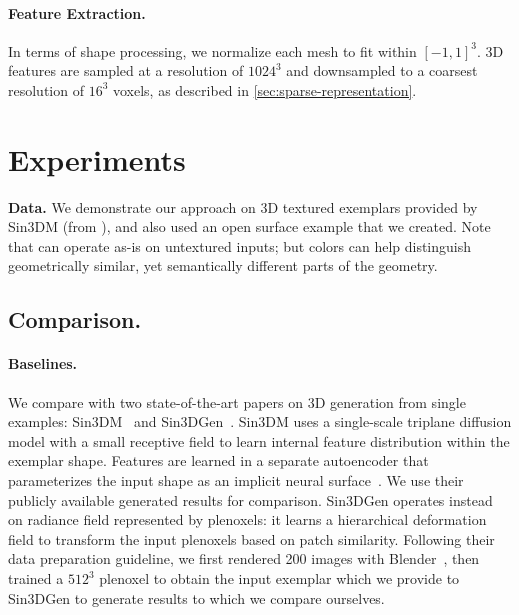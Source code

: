 \paragraph{Feature Extraction.}
In terms of shape processing, we normalize each mesh to fit within $[-1, 1]^3$.
3D features are sampled at a resolution of $1024^3$ and downsampled to a coarsest resolution of $16^3$ voxels, as described in \cref{sec:sparse-representation}.

\section{Experiments}\label{sec:experiments}

\noindent\textbf{Data.} We demonstrate our approach on 3D textured exemplars provided by Sin3DM (from \cite{impjive2021pillar,
kurd2021akropolis,
ashoori2020smalltown,
ustal2020canyon,
carnota2015industrial,
djmaesen2021cliff,
allaboutblender2020wood}), and also used an open surface example that we created.
Note that \ourmethod can operate as-is on untextured inputs; but colors can help distinguish geometrically similar, yet semantically different parts of the geometry. 

\subsection{Comparison.}\label{sec:comparison}
\paragraph{Baselines.}
We compare with two state-of-the-art papers on 3D generation from single examples: Sin3DM~\cite{wu2024sindm} and Sin3DGen~\cite{li2023patch}.
Sin3DM uses a single-scale triplane diffusion model with a small receptive field to learn internal feature distribution within the exemplar shape. Features are learned in a separate autoencoder that parameterizes the input shape as an implicit neural surface~\cite{wang2021neus}. We use their publicly available generated results for comparison.
Sin3DGen operates instead on radiance field represented by plenoxels: it learns a hierarchical deformation field to transform the input plenoxels based on patch similarity. Following their data preparation guideline, we first rendered 200 images with Blender~\cite{blender2018}, then trained a \(512^3\) plenoxel to obtain the input exemplar which we provide to Sin3DGen to generate results to which we compare ourselves. 


